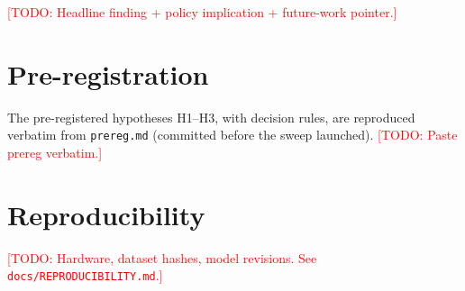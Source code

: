 \documentclass[11pt,letterpaper]{article}
\newcommand{\TODO}[1]{\textcolor{red}{[TODO: #1]}}
\begin{document}
\TODO{Headline finding + policy implication + future-work pointer.}




\appendix

\section{Pre-registration}
\label{appendix:prereg}

The pre-registered hypotheses H1--H3, with decision rules, are reproduced
verbatim from \texttt{prereg.md} (committed before the sweep launched).
\TODO{Paste prereg verbatim.}

\section{Reproducibility}
\label{appendix:reproducibility}

\TODO{Hardware, dataset hashes, model revisions. See
\texttt{docs/REPRODUCIBILITY.md}.}
\end{document}
